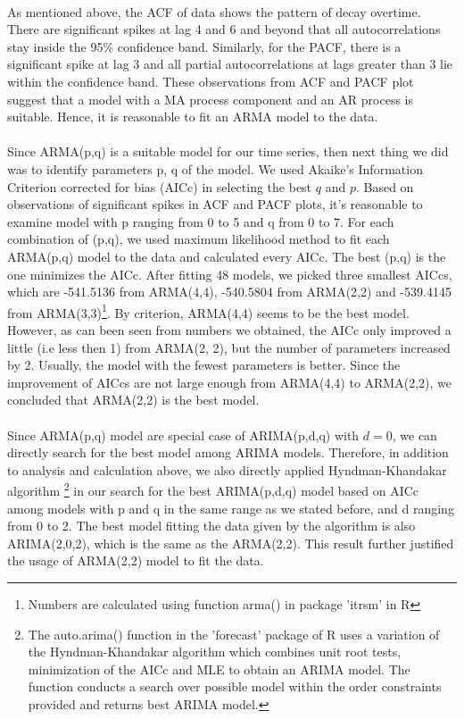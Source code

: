 \documentclass[10pt,letter]{article}
\begin{document}
\paragraph{}
As mentioned above, the ACF of data shows the pattern of decay overtime. There are significant spikes at lag 4 and 6 and beyond that all autocorrelations stay inside the 95\% confidence band. Similarly, for the PACF, there is a significant spike at lag 3 and all partial autocorrelations at lags greater than 3 lie within the confidence band. These observations from ACF and PACF plot suggest that a model with a MA process component and an AR process is suitable. Hence, it is reasonable to fit an ARMA model to the data.

\paragraph{} Since ARMA(p,q) is a suitable model for our time series, then next thing we did was to identify parameters p, q of the model. We used Akaike's Information Criterion corrected for bias (AICc) in selecting the best $q$ and $p$. Based on observations of significant spikes in ACF and PACF plots, it's reasonable to examine model with p ranging from 0 to 5 and q from 0 to 7. For each combination of (p,q), we used maximum likelihood method to fit each ARMA(p,q) model to the data and calculated every AICc. The best (p,q) is the one minimizes the AICc. After fitting 48 models, we picked three smallest AICcs, which are -541.5136 from ARMA(4,4), -540.5804 from ARMA(2,2) and -539.4145 from ARMA(3,3)\footnote[6]{Numbers are calculated using function arma() in package 'itrsm' in R}. By criterion, ARMA(4,4) seems to be the best model. However, as can been seen from numbers we obtained, the AICc only improved a little (i.e less then 1) from ARMA(2, 2), but the number of parameters increased by 2. Usually, the model with the fewest parameters is better. Since the improvement of AICcs are not large enough from ARMA(4,4) to ARMA(2,2), we concluded that ARMA(2,2) is the best model.  

\paragraph{} Since ARMA(p,q) model are special case of ARIMA(p,d,q) with $d=0$, we can directly search for the best model among ARIMA models. Therefore, in addition to analysis and calculation above, we also directly applied Hyndman-Khandakar algorithm \footnote[7]{The auto.arima() function in the 'forecast' package of R uses a variation of the Hyndman-Khandakar algorithm which combines unit root tests, minimization of the AICc and MLE to obtain an ARIMA model. The function conducts a search over possible model within the order constraints provided and returns best ARIMA model.} in our search for the best ARIMA(p,d,q) model based on AICc among models with p and q in the same range as we stated before, and d ranging from 0 to 2.  The best model fitting the data given by the algorithm is also ARIMA(2,0,2), which is the same as the ARMA(2,2). This result further justified the usage of ARMA(2,2) model to fit the data.
\end{document}
